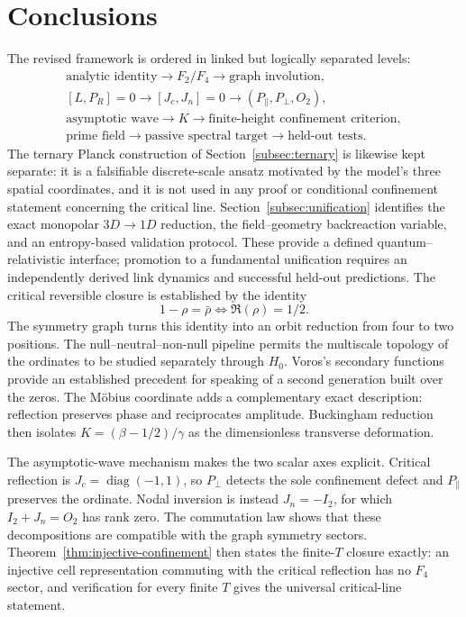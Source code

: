\documentclass[11pt]{amsart}
\theoremstyle{definition}
\theoremstyle{remark}
\begin{document}
\section{Conclusions}
The revised framework is ordered in linked but logically separated levels:
\begin{equation}
 \boxed{\begin{gathered}
 \text{analytic identity}\to F_2/F_4\to\text{graph involution},\\
 [L,P_R]=0\to[J_c,J_n]=0\to(P_{\parallel},P_{\perp},O_2),\\
 \text{asymptotic wave}\to K\to\text{finite-height confinement criterion},\\
 \text{prime field}\to\text{passive spectral target}\to\text{held-out tests}.
 \end{gathered}}
\end{equation}
The ternary Planck construction of Section~\ref{subsec:ternary} is likewise kept separate: it is
a falsifiable discrete-scale ansatz motivated by the model's three spatial coordinates, and it is
not used in any proof or conditional confinement statement concerning the critical line.
Section~\ref{subsec:unification} identifies the exact monopolar $3D\to1D$ reduction, the
field--geometry backreaction variable, and an entropy-based validation protocol.  These provide a
defined quantum--relativistic interface; promotion to a fundamental unification requires an
independently derived link dynamics and successful held-out predictions.
The critical reversible closure is established by the identity
\begin{equation}
 1-\rho=\bar\rho\iff\Re(\rho)=1/2.
\end{equation}
The symmetry graph turns this identity into an orbit reduction from four to two positions. The null--neutral--non-null pipeline permits the multiscale topology of the ordinates to be studied separately through $H_0$. Voros's secondary functions provide an established precedent for speaking of a second generation built over the zeros.  The M\"obius coordinate adds a complementary exact description: reflection preserves phase and reciprocates amplitude.  Buckingham reduction then isolates $K=(\beta-1/2)/\gamma$ as the dimensionless transverse deformation.

The asymptotic-wave mechanism makes the two scalar axes explicit.  Critical reflection is
$J_c=\operatorname{diag}(-1,1)$, so $P_{\perp}$ detects the sole confinement defect and
$P_{\parallel}$ preserves the ordinate.  Nodal inversion is instead $J_n=-I_2$, for which
$I_2+J_n=O_2$ has rank zero.  The commutation law shows that these decompositions are
compatible with the graph symmetry sectors.  Theorem~\ref{thm:injective-confinement} then
states the finite-$T$ closure exactly: an injective cell representation commuting with the
critical reflection has no $F_4$ sector, and verification for every finite $T$ gives the
universal critical-line statement.
\end{document}
